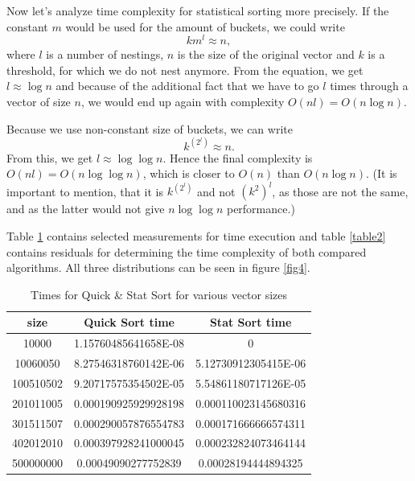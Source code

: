 \documentclass[12pt]{article}
\begin{document}
        Now let's analyze time complexity for statistical sorting more precisely. If the constant $m$ would be used for the amount of buckets, we could write
        \[
        k m^l \approx n, 
        \]
        where $l$ is a number of nestings, $n$ is the size of the original vector and $k$ is a threshold, for which we do not nest anymore. From the equation, we get $l \approx \log n$ and because of the additional fact that we have to go $l$ times through a vector of size $n$, we would end up again with complexity $O(n l) = O(n \log n)$.

        Because we use non-constant size of buckets, we can write
        \[
        k^{(2^l)} \approx n.
        \]
        From this, we get $l \approx \log \log n$. Hence the final complexity is $O(n l) = O(n \log \log n)$, which is closer to $O(n)$ than $O(n \log n)$. (It is important to mention, that it is $k^{(2^l)}$ and not ${(k^2)}^l$, as those are not the same, and as the latter would not give $n \log \log n$ performance.)
			
		Table \ref{table1} contains selected measurements for time execution and table \ref{table2} contains residuals for determining the time complexity of both compared algorithms. All three distributions can be seen in figure \ref{fig4}.
		
		\begin{table}
		\caption{Times for Quick \& Stat Sort for various vector sizes}
		\begin{center}
		\begin{tabular}{ |c|c|c| }
		
		\hline
		
		size & Quick Sort time & Stat Sort time \\

		\hline\hline		
		
		10000		& 1.15760485641658E-08	& 0 \\
		10060050    & 8.27546318760142E-06	& 5.12730912305415E-06 \\
		100510502	& 9.20717575354502E-05	& 5.54861180717126E-05 \\
		201011005	& 0.000190925929928198	& 0.000110023145680316 \\
		301511507	& 0.000290057876554783	& 0.000171666666574311 \\
		402012010	& 0.000397928241000045	& 0.000232824073464144 \\
		500000000	& 0.00049090277752839	& 0.00028194444894325 \\

		\hline
		\end{tabular}
		\end{center}
		\label{table1}
		\end{table}
\end{document}
